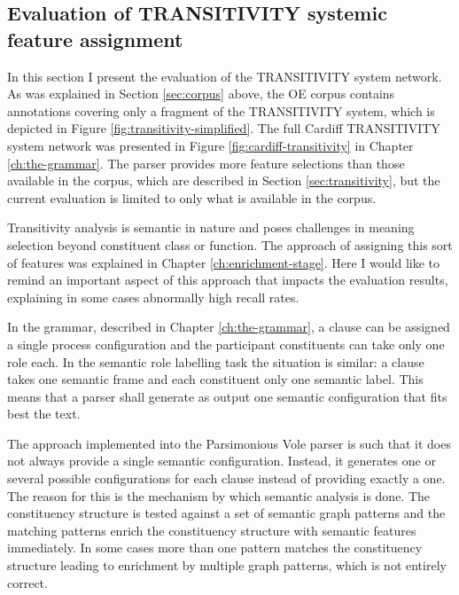     
    
\subsection{Evaluation of TRANSITIVITY systemic feature assignment}
\label{sec:systemic-evaluation-TRANSITIVITY}
    
    In this section I present the evaluation of the TRANSITIVITY system network. As was explained in Section \ref{sec:corpus} above, the OE corpus contains annotations covering only a fragment of the TRANSITIVITY system, which is depicted in Figure \ref{fig:transitivity-simplified}. The full Cardiff TRANSITIVITY system network was presented in Figure \ref{fig:cardiff-transitivity} in Chapter \ref{ch:the-grammar}. The parser provides more feature selections than those available in the corpus, which are described in Section \ref{sec:transitivity}, but the current evaluation is limited to only what is available in the corpus.
    
    Transitivity analysis is semantic in nature and poses challenges in meaning selection beyond constituent class or function. The approach of assigning this sort of features was explained in Chapter \ref{ch:enrichment-stage}. Here I would like to remind an important aspect of this approach that impacts the evaluation results, explaining in some cases abnormally high recall rates.
    
    In the grammar, described in Chapter \ref{ch:the-grammar}, a clause can be assigned a single process configuration and the participant constituents can take only one role each. In the semantic role labelling task the situation is similar: a clause takes one semantic frame and each constituent only one semantic label. This means that a parser shall generate as output one semantic configuration that fits best the text. 
    
    The approach implemented into the Parsimonious Vole parser is such that it does not always provide a single semantic configuration. Instead, it generates one or several possible configurations for each clause instead of providing exactly a one. The reason for this is the mechanism by which semantic analysis is done. The constituency structure is tested against a set of semantic graph patterns and the matching patterns enrich the constituency structure with semantic features immediately. In some cases more than one pattern matches the constituency structure leading to enrichment by multiple graph patterns, which is not entirely correct. 
    
